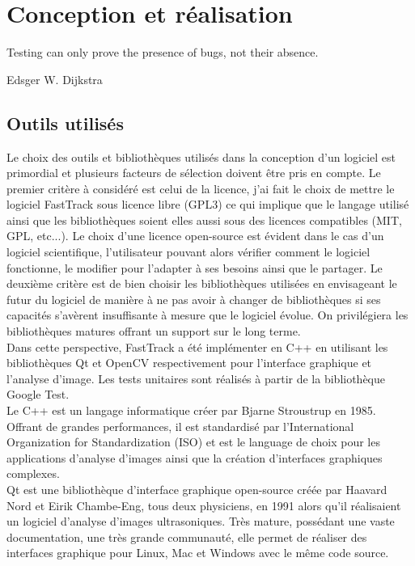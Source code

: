 \chapter{Conception et réalisation}

    \epigraph{Testing can only prove the presence of bugs, not their absence.}{Edsger W. Dijkstra}

	\section{Outils utilisés}
	
	Le choix des outils et bibliothèques utilisés dans la conception d'un logiciel est primordial et plusieurs facteurs de sélection doivent être pris en compte.
	Le premier critère à considéré est celui de la licence, j'ai fait le choix de mettre le logiciel FastTrack sous licence libre (GPL3) ce qui implique que le langage utilisé ainsi que les bibliothèques soient elles aussi sous des licences compatibles (MIT, GPL, etc...). Le choix d'une licence open-source est évident dans le cas d'un logiciel scientifique, l'utilisateur pouvant alors vérifier comment le logiciel fonctionne, le modifier pour l'adapter à ses besoins ainsi que le partager.
	Le deuxième critère est de bien choisir les bibliothèques utilisées en envisageant le futur du logiciel de manière à ne pas avoir à changer de bibliothèques si ses capacités s'avèrent insuffisante à mesure que le logiciel évolue. On privilégiera les bibliothèques matures offrant un support sur le long terme.\\
	
	Dans cette perspective, FastTrack a été implémenter en C++ \cite{C++} en utilisant les bibliothèques Qt \cite{Qt} et OpenCV \cite{opencv_library} respectivement pour l'interface graphique et l'analyse d'image. Les tests unitaires sont réalisés à partir de la bibliothèque Google Test.\\
	
	Le C++ est un langage informatique créer par Bjarne Stroustrup en 1985. Offrant de grandes performances, il est standardisé par l'International Organization for Standardization (ISO) et est le language de choix pour les applications d'analyse d'images ainsi que la création d'interfaces graphiques complexes.\\
	
	Qt est une bibliothèque d'interface graphique open-source créée par Haavard Nord et Eirik Chambe-Eng, tous deux physiciens, en 1991 alors qu'il réalisaient un logiciel d'analyse d'images ultrasoniques. Très mature, possédant une vaste documentation, une très grande communauté, elle permet de réaliser des interfaces graphique pour Linux, Mac et Windows avec le même code source.\\
	
